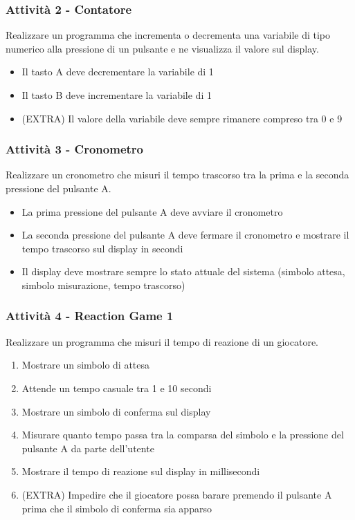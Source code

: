 \documentclass{beamer}
\begin{document}
\begin{frame}
	\frametitle{Attività 2 - Contatore}

	Realizzare un programma che incrementa o decrementa una variabile di tipo numerico alla pressione di un pulsante e ne visualizza il valore sul display.

	\vspace{2em}
	\begin{itemize}
		\item Il tasto A deve decrementare la variabile di 1
		\item Il tasto B deve incrementare la variabile di 1
		\item (EXTRA) Il valore della variabile deve sempre rimanere compreso tra 0 e 9
	\end{itemize}
	

\end{frame}

\begin{frame}
	\frametitle{Attività 3 - Cronometro}

	Realizzare un cronometro che misuri il tempo trascorso tra la prima e la seconda pressione del pulsante A.

	\vspace{2em}
	\begin{itemize}
		\item La prima pressione del pulsante A deve avviare il cronometro 
		\item La seconda pressione del pulsante A deve fermare il cronometro e mostrare il tempo trascorso sul display in secondi
		\item Il display deve mostrare sempre lo stato attuale del sistema (simbolo attesa, simbolo misurazione, tempo trascorso)
	\end{itemize}
\end{frame}

\begin{frame}
	\frametitle{Attività 4 - Reaction Game 1}
	Realizzare un programma che misuri il tempo di reazione di un giocatore.
	\vspace{2em}
	\begin{enumerate}
		\item Mostrare un simbolo di attesa
		\item Attende un tempo casuale tra 1 e 10 secondi
		\item Mostrare un simbolo di conferma sul display
		\item Misurare quanto tempo passa tra la comparsa del simbolo e la pressione del pulsante A da parte dell'utente
		\item Mostrare il tempo di reazione sul display in millisecondi
		\item (EXTRA) Impedire che il giocatore possa barare premendo il pulsante A prima che il simbolo di conferma sia apparso
	\end{enumerate}	
\end{frame}
\end{document}
